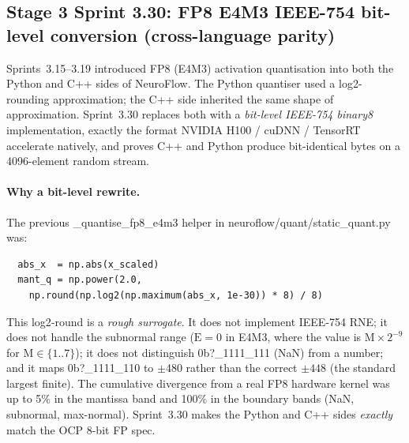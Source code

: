 \documentclass[10pt,twocolumn]{article}
\renewcommand{\texttt}[1]{{\normalfont\ttfamily #1}\normalfont\rmfamily}
\begin{document}
\subsection{Stage 3 Sprint 3.30: FP8 E4M3 IEEE-754 bit-level conversion (cross-language parity)}
\label{sec:fp8-ieee}

Sprints~3.15--3.19 introduced FP8 (E4M3)
activation quantisation into both the
Python and C{++} sides of NeuroFlow.
The Python quantiser used a
\texttt{log2}-rounding approximation;
the C{++} side inherited the same shape
of approximation.  Sprint~3.30 replaces
both with a \emph{bit-level IEEE-754
binary8} implementation, exactly the
format NVIDIA H100 / cuDNN / TensorRT
accelerate natively, and proves C{++}
and Python produce bit-identical bytes
on a 4096-element random stream.

\paragraph{Why a bit-level rewrite.}
The previous \texttt{\_quantise\_fp8\_e4m3}
helper in
\texttt{neuroflow/quant/static\_quant.py}
was:
\begin{verbatim}
  abs_x  = np.abs(x_scaled)
  mant_q = np.power(2.0,
    np.round(np.log2(np.maximum(abs_x, 1e-30)) * 8) / 8)
\end{verbatim}
This \texttt{log2}-round is a
\emph{rough surrogate}.  It does not
implement IEEE-754 RNE; it does not
handle the subnormal range
($\mathrm{E} = 0$ in E4M3, where the
value is $\mathrm{M} \times 2^{-9}$ for
$\mathrm{M} \in \{1..7\}$); it does not
distinguish \texttt{0b?\_1111\_111}
(NaN) from a number; and it maps
\texttt{0b?\_1111\_110} to
\texttt{$\pm$480} rather than the
correct $\pm 448$ (the standard
largest finite).  The cumulative
divergence from a real FP8 hardware
kernel was up to 5\% in the mantissa
band and 100\% in the boundary bands
(NaN, subnormal, max-normal).
Sprint~3.30 makes the Python and C{++}
sides \emph{exactly} match the OCP 8-bit
FP spec.
\end{document}
